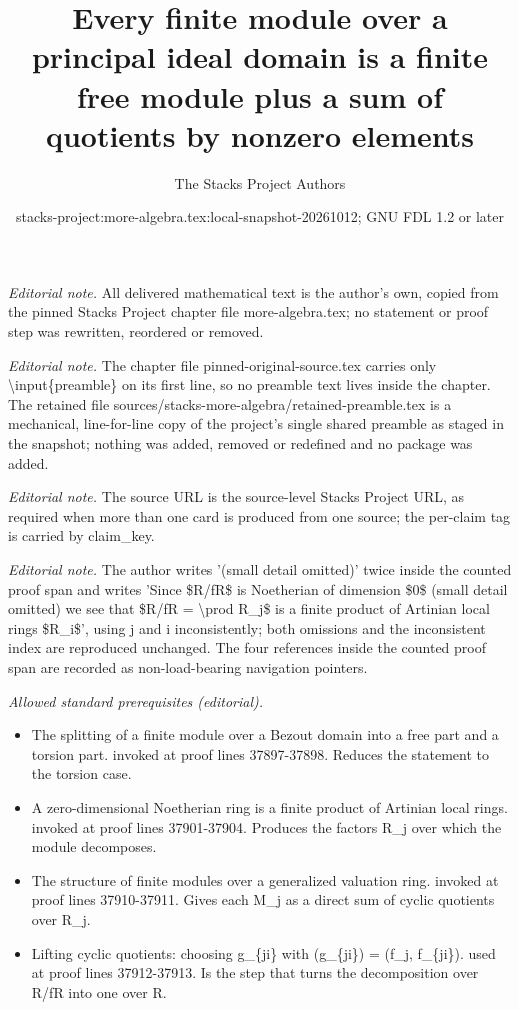 \documentclass[10pt,a4paper]{amsart}
\title{Every finite module over a principal ideal domain is a finite free module plus a sum of quotients by nonzero elements}
\author{The Stacks Project Authors}
\date{stacks-project:more-algebra.tex:local-snapshot-20261012; GNU FDL 1.2 or later}
\theoremstyle{plain}
\theoremstyle{definition}
\theoremstyle{remark}
\numberwithin{equation}{subsection}
\begin{document}
\maketitle
\setcounter{subsection}{1}
\noindent\textit{Editorial note.} All delivered mathematical text is the author's own, copied from the pinned Stacks Project chapter file more-algebra.tex; no statement or proof step was rewritten, reordered or removed.\par\medskip
\noindent\textit{Editorial note.} The chapter file pinned-original-source.tex carries only \textbackslash{}input\{preamble\} on its first line, so no preamble text lives inside the chapter. The retained file sources/stacks-more-algebra/retained-preamble.tex is a mechanical, line-for-line copy of the project's single shared preamble as staged in the snapshot; nothing was added, removed or redefined and no package was added.\par\medskip
\noindent\textit{Editorial note.} The source URL is the source-level Stacks Project URL, as required when more than one card is produced from one source; the per-claim tag is carried by claim\_key.\par\medskip
\noindent\textit{Editorial note.} The author writes '(small detail omitted)' twice inside the counted proof span and writes 'Since \$R/fR\$ is Noetherian of dimension \$0\$ (small detail omitted) we see that \$R/fR = \textbackslash{}prod R\_j\$ is a finite product of Artinian local rings \$R\_i\$', using j and i inconsistently; both omissions and the inconsistent index are reproduced unchanged. The four references inside the counted proof span are recorded as non-load-bearing navigation pointers.\par\medskip
\noindent\textit{Allowed standard prerequisites (editorial).}\begin{itemize}
\item The splitting of a finite module over a Bezout domain into a free part and a torsion part. invoked at proof lines 37897-37898. Reduces the statement to the torsion case.
\item A zero-dimensional Noetherian ring is a finite product of Artinian local rings. invoked at proof lines 37901-37904. Produces the factors R\_j over which the module decomposes.
\item The structure of finite modules over a generalized valuation ring. invoked at proof lines 37910-37911. Gives each M\_j as a direct sum of cyclic quotients over R\_j.
\item Lifting cyclic quotients: choosing g\_\{ji\} with (g\_\{ji\}) = (f\_j, f\_\{ji\}). used at proof lines 37912-37913. Is the step that turns the decomposition over R/fR into one over R.
\end{itemize}\medskip
\end{document}
